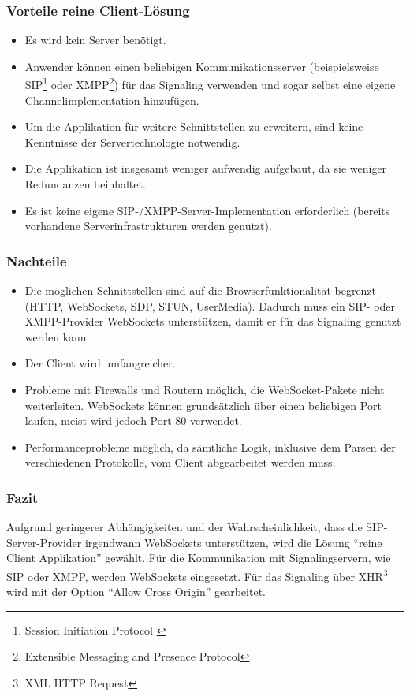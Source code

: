 		\subsubsection{Vorteile reine Client-Lösung}
		\begin{itemize}
			\item Es wird kein Server benötigt.
			\item Anwender können einen beliebigen Kommunikationsserver
			(beispielsweise SIP\footnote{Session Initiation Protocol \cite{IETF-SDP-RFC}} oder
			XMPP\footnote{Extensible Messaging and Presence Protocol}) für das
			Signaling verwenden und sogar selbst eine eigene Channelimplementation
			hinzufügen.
			\item Um die Applikation für weitere Schnittstellen zu erweitern, sind keine
			Kenntnisse der Servertechnologie notwendig.
			\item Die Applikation ist insgesamt weniger aufwendig aufgebaut, da sie
			weniger Redundanzen beinhaltet.
			\item Es ist keine eigene SIP-/XMPP-Server-Implementation erforderlich
			(bereits vorhandene Serverinfrastrukturen werden genutzt).
		\end{itemize}
		\subsubsection{Nachteile}
		\begin{itemize}
			\item Die möglichen Schnittstellen sind auf die Browserfunktionalität
			begrenzt (HTTP, WebSockets, SDP, STUN, UserMedia). Dadurch
			muss ein SIP- oder XMPP-Provider WebSockets unterstützen, damit er für das
			Signaling genutzt werden kann.
			\item Der Client wird umfangreicher.
			\item Probleme mit Firewalls und Routern möglich, die WebSocket-Pakete nicht
			weiterleiten. WebSockets können grundsätzlich über einen beliebigen Port laufen, meist wird jedoch Port 80 verwendet.
			\item Performanceprobleme möglich, da sämtliche Logik, inklusive dem Parsen
			der verschiedenen Protokolle, vom Client abgearbeitet werden muss.
		\end{itemize}

		\subsubsection{Fazit}
			Aufgrund geringerer Abhängigkeiten und der Wahrscheinlichkeit, dass die
			SIP-Server-Provider irgendwann WebSockets unterstützen, wird die Lösung
			"`reine Client Applikation"' gewählt.
			Für die Kommunikation mit Signalingservern, wie SIP oder XMPP, werden
			WebSockets eingesetzt. Für das Signaling über XHR\footnote{XML HTTP Request}
			wird mit der Option "`Allow Cross Origin"' gearbeitet.

